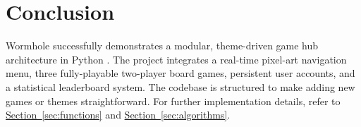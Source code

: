 \documentclass[12pt, a4paper]{article}
\begin{document}
\section{Conclusion}

Wormhole successfully demonstrates a modular, theme-driven game hub architecture in Python \cite{pygame_book}. The project integrates a real-time pixel-art navigation menu, three fully-playable two-player board games, persistent user accounts, and a statistical leaderboard system. The codebase is structured to make adding new games or themes straightforward. For further implementation details, refer to \hyperref[sec:functions]{Section~\ref*{sec:functions}} and \hyperref[sec:algorithms]{Section~\ref*{sec:algorithms}}.

\newpage


\end{document}

